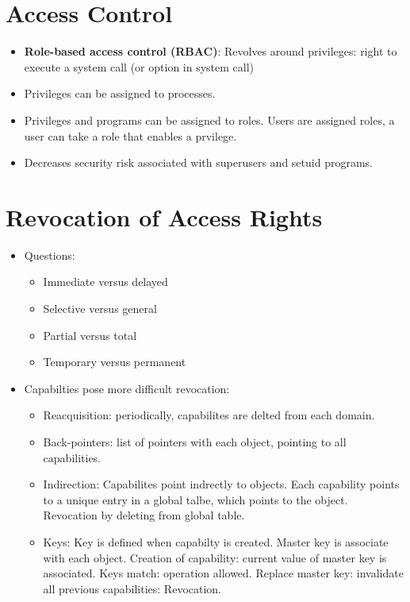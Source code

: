 \documentclass[10pt]{report}
\begin{document}
	\section{Access Control}
		\begin{itemize}
			\item \textbf{Role-based access control (RBAC)}: Revolves around privileges: right to execute a system call (or option in system call)
			\item Privileges can be assigned to processes.
			\item Privileges and programs can be assigned to roles. Users are assigned roles, a user can take a role that enables a prvilege.
			\item Decreases security risk associated with superusers and setuid programs.
		\end{itemize}


	\section{Revocation of Access Rights}
		\begin{itemize}
			\item Questions:
			\begin{itemize}
				\item Immediate versus delayed
				\item Selective versus general
				\item Partial versus total
				\item Temporary versus permanent
			\end{itemize}
			\item Capabilties pose more difficult revocation:
			\begin{itemize}
				\item Reacquisition: periodically, capabilites are delted from each domain.
				\item Back-pointers: list of pointers with each object, pointing to all capabilities.
				\item Indirection: Capabilites point indrectly to objects. Each capability points to a unique entry in a global talbe, which points to the object. Revocation by deleting from global table.
				\item Keys: Key is defined when capabilty is created. Master key is associate with each object. Creation of capability: current value of master key is associated. Keys match: operation allowed. Replace master key: invalidate all previous capabilities: Revocation.
			\end{itemize}
		\end{itemize}
\end{document}
